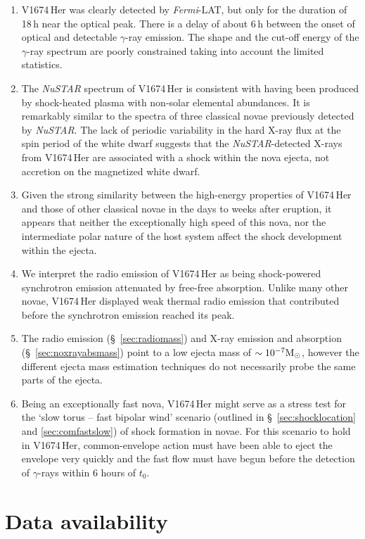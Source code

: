 \documentclass[a4paper,fleqn,usenatbib]{mnras}
\newcommand{\nova}{V1674\,Her}
\newcommand{\fermilat}{\emph{Fermi}-LAT}
\begin{document}
\begin{enumerate}
\item \nova{} was clearly detected by \fermilat{}, but only for the
duration of 18\,h near the optical peak. There is a delay of about 6\,h 
between the onset of optical and detectable $\gamma$-ray emission. 
The shape and the cut-off energy of the $\gamma$-ray spectrum are poorly constrained taking into account the limited statistics.
\item The {\em NuSTAR} spectrum of \nova{} is consistent with 
having been produced 
by shock-heated plasma with non-solar elemental abundances. It is remarkably
similar to the spectra of three classical novae previously detected by {\em NuSTAR}.
The lack of periodic variability in the hard X-ray flux at the spin period of the white dwarf 
suggests that the {\em NuSTAR}-detected X-rays from
\nova{} are associated with a shock within the
nova ejecta, not accretion on the magnetized white dwarf.
\item Given the strong similarity between the high-energy properties of \nova{} and those of other classical novae in the days to weeks after eruption, it appears that neither the exceptionally high speed
of this nova, nor the intermediate polar nature of the host system affect the shock development within the ejecta.
\item We interpret the radio emission of \nova{} as being shock-powered synchrotron emission attenuated by free-free absorption. 
Unlike many other novae, \nova{} displayed weak thermal radio emission that
contributed before the synchrotron emission reached its peak.
\item The radio emission (\S~\ref{sec:radiomass}) and X-ray emission and absorption
(\S~\ref{sec:noxrayabsmass}) point to a low ejecta mass of $\sim 10^{-7} {\rm M}_\odot$, 
however the different ejecta mass estimation techniques do not necessarily probe the same parts of the ejecta.
\item Being an exceptionally fast nova, \nova{} might serve as a stress test for 
the `slow torus -- fast bipolar wind' scenario (outlined in \S~\ref{sec:shocklocation} and \ref{sec:comfastslow}) 
of shock formation in novae. For this scenario to hold in \nova{}, common-envelope action must have been able to eject 
the envelope very quickly and the fast flow must have begun before the detection of $\gamma$-rays within 6 hours of $t_0$.
\end{enumerate}

\section*{Data availability}
\end{document}
